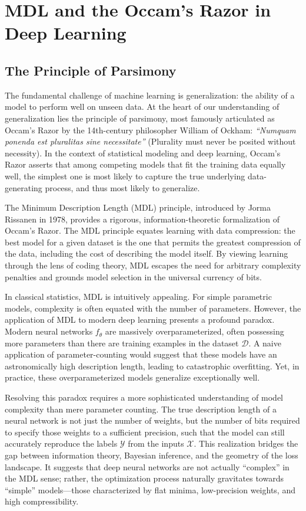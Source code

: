 \chapter{MDL and the Occam's Razor in Deep Learning}
\label{ch:mdl_occam}

\section{The Principle of Parsimony}

The fundamental challenge of machine learning is generalization: the ability of a model to perform well on unseen data. At the heart of our understanding of generalization lies the principle of parsimony, most famously articulated as Occam's Razor by the 14th-century philosopher William of Ockham: \textit{``Numquam ponenda est pluralitas sine necessitate''} (Plurality must never be posited without necessity). In the context of statistical modeling and deep learning, Occam's Razor asserts that among competing models that fit the training data equally well, the simplest one is most likely to capture the true underlying data-generating process, and thus most likely to generalize.

The Minimum Description Length (MDL) principle, introduced by Jorma Rissanen in 1978, provides a rigorous, information-theoretic formalization of Occam's Razor. The MDL principle equates learning with data compression: the best model for a given dataset is the one that permits the greatest compression of the data, including the cost of describing the model itself. By viewing learning through the lens of coding theory, MDL escapes the need for arbitrary complexity penalties and grounds model selection in the universal currency of bits.

In classical statistics, MDL is intuitively appealing. For simple parametric models, complexity is often equated with the number of parameters. However, the application of MDL to modern deep learning presents a profound paradox. Modern neural networks $f_\theta$ are massively overparameterized, often possessing more parameters than there are training examples in the dataset $\mathcal{D}$. A naive application of parameter-counting would suggest that these models have an astronomically high description length, leading to catastrophic overfitting. Yet, in practice, these overparameterized models generalize exceptionally well. 

Resolving this paradox requires a more sophisticated understanding of model complexity than mere parameter counting. The true description length of a neural network is not just the number of weights, but the number of bits required to specify those weights to a sufficient precision, such that the model can still accurately reproduce the labels $\mathcal{Y}$ from the inputs $\mathcal{X}$. This realization bridges the gap between information theory, Bayesian inference, and the geometry of the loss landscape. It suggests that deep neural networks are not actually ``complex'' in the MDL sense; rather, the optimization process naturally gravitates towards ``simple'' models---those characterized by flat minima, low-precision weights, and high compressibility.

